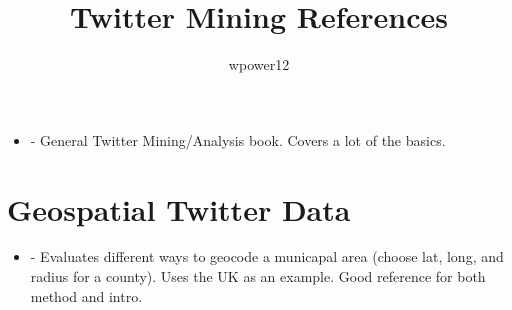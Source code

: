 \documentclass{article}
\title{Twitter Mining References}
\author{wpower12}
\begin{document}
\begin{itemize}
	\item \cite{kumar_twitter_2014} - General Twitter Mining/Analysis book. Covers a lot of the basics. 
\end{itemize}

\section{Geospatial Twitter Data}
\begin{itemize}
	\item \cite{schlosser_comparing_2021} - Evaluates different ways to geocode a municapal area (choose lat, long, and radius for a county). Uses the UK as an example. Good reference for both method and intro. 
\end{itemize}

\printbibliography
\end{document}
